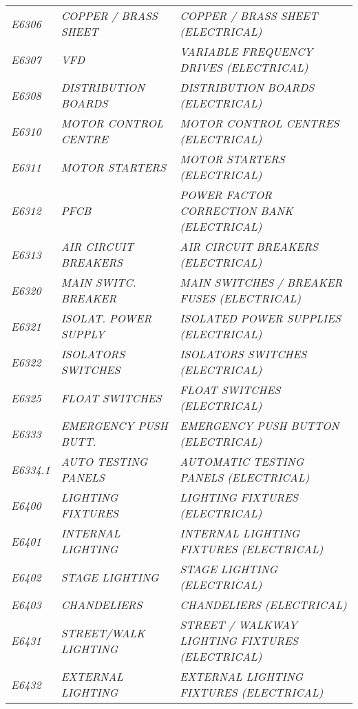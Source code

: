 \begin{landscape}
\begin{longtable}[l]{l%
                  l|%
                  l|}
\itshape E6306       &\itshape COPPER / BRASS SHEET   &\itshape COPPER / BRASS SHEET (ELECTRICAL)   \\
\itshape E6307       &\itshape VFD   &\itshape VARIABLE FREQUENCY DRIVES (ELECTRICAL)   \\
\itshape E6308       &\itshape DISTRIBUTION BOARDS   &\itshape DISTRIBUTION BOARDS (ELECTRICAL)   \\
\itshape E6310       &\itshape MOTOR CONTROL CENTRE   &\itshape MOTOR CONTROL CENTRES (ELECTRICAL)   \\
\itshape E6311       &\itshape MOTOR STARTERS   &\itshape MOTOR STARTERS (ELECTRICAL)   \\
\itshape E6312       &\itshape PFCB   &\itshape POWER FACTOR CORRECTION BANK (ELECTRICAL)   \\
\itshape E6313       &\itshape AIR CIRCUIT BREAKERS   &\itshape AIR CIRCUIT BREAKERS (ELECTRICAL)   \\
\itshape E6320       &\itshape MAIN SWITC.  BREAKER   &\itshape MAIN SWITCHES / BREAKER FUSES (ELECTRICAL)   \\
\itshape E6321       &\itshape ISOLAT. POWER SUPPLY   &\itshape ISOLATED POWER SUPPLIES (ELECTRICAL)   \\
\itshape E6322       &\itshape ISOLATORS SWITCHES   &\itshape ISOLATORS SWITCHES (ELECTRICAL)   \\
\itshape E6325       &\itshape FLOAT SWITCHES   &\itshape FLOAT SWITCHES (ELECTRICAL)   \\
\itshape E6333       &\itshape EMERGENCY PUSH BUTT.   &\itshape EMERGENCY PUSH BUTTON (ELECTRICAL)   \\
\itshape E6334.1     &\itshape AUTO TESTING PANELS   &\itshape AUTOMATIC TESTING PANELS (ELECTRICAL)   \\
\itshape E6400       &\itshape LIGHTING FIXTURES   &\itshape LIGHTING FIXTURES (ELECTRICAL)   \\
\itshape E6401       &\itshape INTERNAL LIGHTING   &\itshape INTERNAL LIGHTING FIXTURES (ELECTRICAL)   \\
\itshape E6402       &\itshape STAGE LIGHTING   &\itshape STAGE LIGHTING (ELECTRICAL)   \\
\itshape E6403       &\itshape CHANDELIERS   &\itshape CHANDELIERS (ELECTRICAL)   \\
\itshape E6431       &\itshape STREET/WALK LIGHTING   &\itshape STREET / WALKWAY LIGHTING FIXTURES (ELECTRICAL)   \\
\itshape E6432       &\itshape EXTERNAL LIGHTING   &\itshape EXTERNAL LIGHTING FIXTURES (ELECTRICAL)   \\

\end{longtable}
\end{landscape}

